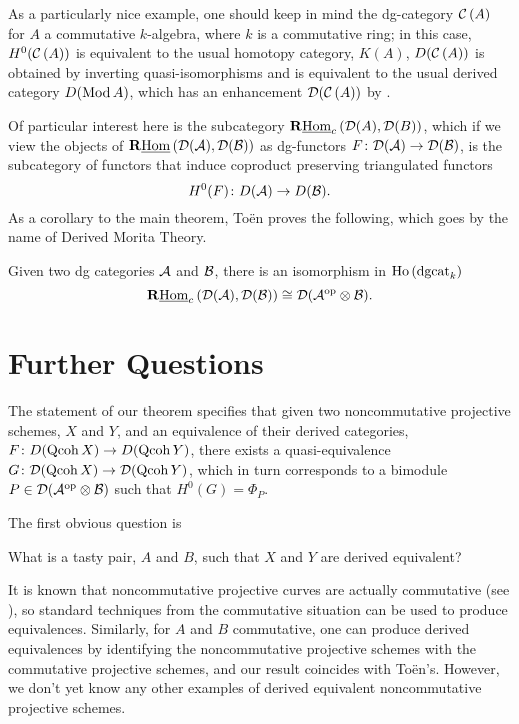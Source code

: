 \documentclass[reqno, 12pt]{amsart}
\begin{document}
\begin{example}
  As a particularly nice example, one should keep in mind the dg-category $\mathcal{C}\left(A\right)$ for $A$ a commutative $k$-algebra, where $k$ is a commutative ring; in this case, $H^0(\mathcal{C}\left(A\right))$ is equivalent to the usual homotopy category, $K(A)$, $D(\mathcal{C}\left(A\right))$ is obtained by inverting quasi-isomorphisms and is equivalent to the usual derived category $D(\operatorname{Mod}A)$, which has an enhancement $\mathcal{D}(\mathcal{C}\left(A\right))$ by \cite{Lunts Orlov}.
\end{example}
Of particular interest here is the subcategory $\mathbf{R}\underline{\operatorname{Hom}}_c\left(\mathcal{D}(A),\mathcal{D}(B)\right)$, which if we view the objects of $\mathbf{R}\underline{\operatorname{Hom}}\left(\mathcal{D}(\mathcal{A}),\mathcal{D}(\mathcal{B})\right)$ as dg-functors $F \colon \mathcal{D}(\mathcal{A}) \to \mathcal{D}(\mathcal{B})$, is the subcategory of functors that induce coproduct preserving triangulated functors
$$H^0(F) \colon D(\mathcal{A}) \to D(\mathcal{B}).$$
As a corollary to the main theorem, To\"en proves the following, which goes by the name of Derived Morita Theory.
\begin{corollary} \label{corollary: Toen}
  Given two dg categories $\mathcal{A}$ and $\mathcal{B}$, there is an isomorphism in $\operatorname{Ho}\left(\operatorname{dgcat}_k\right)$
  $$\mathbf{R}\underline{\operatorname{Hom}}_c\left(\mathcal{D}(\mathcal{A}), \mathcal{D}(\mathcal{B})\right) \cong \mathcal{D}(\mathcal{A}^{\operatorname{op}} \otimes \mathcal{B}).$$
\end{corollary}

\section{Further Questions}
The statement of our theorem specifies that given two noncommutative projective schemes, $X$ and $Y$, and an equivalence of their derived categories, $F \colon D(\operatorname{Qcoh}X) \to D(\operatorname{Qcoh}Y)$, there exists a quasi-equivalence $G \colon \mathcal{D}(\operatorname{Qcoh}X) \to \mathcal{D}(\operatorname{Qcoh}Y)$, which in turn corresponds to a bimodule $P \in \mathcal{D}(\mathcal{A}^{\operatorname{op}} \otimes \mathcal{B})$ such that $H^0(G) = \Phi_P$.

The first obvious question is
\begin{question}
  What is a tasty pair, $A$ and $B$, such that $X$ and $Y$ are derived equivalent?
\end{question}
It is known that noncommutative projective curves are actually commutative (see \cite{AS}), so standard techniques from the commutative situation can be used to produce equivalences.
Similarly, for $A$ and $B$ commutative, one can produce derived equivalences by identifying the noncommutative projective schemes with the commutative projective schemes, and our result coincides with To\"en's.
However, we don't yet know any other examples of derived equivalent noncommutative projective schemes.
\end{document}

